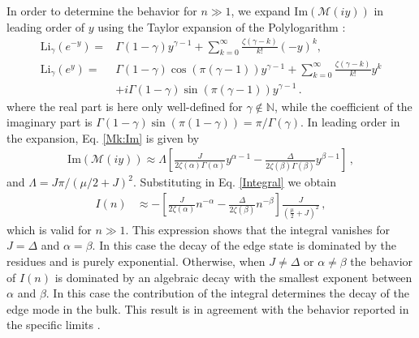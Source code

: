 \documentclass[pra,twocolumn,
superscriptaddress,
showpacs,
aps
]{revtex4-1}
\begin{document}

In order to determine the behavior for $n\gg 1$, we expand $\mathrm{Im}({\mathcal M}(iy))$ in leading order of $y$ using the Taylor expansion of the Polylogarithm \cite{Olver:2010}:
\begin{align*}
\mathrm{Li}_\gamma(e^{-y})=&\Gamma(1-\gamma)y^{\gamma-1}+\sum_{k=0}^\infty\frac{\zeta(\gamma-k)}{k!}(-y)^k,\\
\mathrm{Li}_\gamma(e^{y})=&\Gamma(1-\gamma)\cos(\pi(\gamma-1))y^{\gamma-1}+\sum_{k=0}^\infty\frac{\zeta(\gamma-k)}{k!}y^k\nonumber\\&+i\Gamma(1-\gamma)\sin(\pi(\gamma-1))y^{\gamma-1}\,.
\end{align*}
where the real part is here only well-defined for $\gamma\notin \mathbb{N}$, while the coefficient of the imaginary part is ${\Gamma(1-\gamma)\sin(\pi(1-\gamma))}={\pi/\Gamma(\gamma)}$. 
In leading order in the expansion, Eq. \eqref{Mk:Im} is given by 
\begin{align*}
\mathrm{Im}({\mathcal M}(iy))\approx\Lambda\left[\frac{J}{2\zeta(\alpha)\Gamma(\alpha)}y^{\alpha-1}-\frac{\Delta}{2\zeta(\beta)\Gamma(\beta)}y^{\beta-1}\right]\,,
\end{align*}
and $\Lambda=J\pi/(\mu/2+J)^2$.
Substituting in Eq. \eqref{Integral} we obtain
\begin{align}
I(n)&\approx-\left[\frac{J}{2\zeta(\alpha)}n^{-\alpha}-\frac{\Delta}{2\zeta(\beta)}n^{-\beta}\right]\frac{J}{\left(\frac{\mu}{2}+J\right)^2}\,,\label{algebraic}
\end{align}
which is valid for $n\gg 1$. This expression shows that the integral vanishes for  $J=\Delta$ and $\alpha=\beta$. In this case the decay of the edge state is dominated by the residues and is purely exponential. 
Otherwise, when $J\neq\Delta$ or $\alpha\neq\beta$ the behavior of $I(n)$ is dominated by an algebraic decay with the smallest exponent between $\alpha$ and $\beta$. In this case the contribution of the integral determines the decay of the edge mode in the bulk. This result is in agreement with the behavior reported in the specific limits \cite{Vodola2014,Vodola2016,Alecce2017}.
\end{document}
